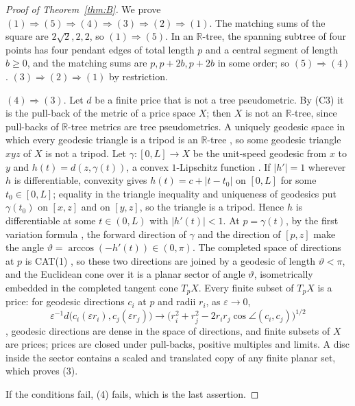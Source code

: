 \documentclass[11pt,a4paper]{article}
\theoremstyle{definition}
\newcommand{\R}{\mathbb{R}}
\newcommand{\CS}{\textup{C3}}
\begin{document}
\begin{proof}[Proof of Theorem~\ref{thm:B}]
We prove $(1)\Rightarrow(5)\Rightarrow(4)\Rightarrow(3)\Rightarrow(2)
\Rightarrow(1)$. The matching sums of the square are $2\sqrt2,2,2$, so
$(1)\Rightarrow(5)$. In an $\R$-tree, the spanning subtree of four points has
four pendant edges of total length $p$ and a central segment of length $b\ge0$,
and the matching sums are $p,p+2b,p+2b$ in some order; so $(5)\Rightarrow(4)$.
$(3)\Rightarrow(2)\Rightarrow(1)$ by restriction.

$(4)\Rightarrow(3)$. Let $d$ be a finite price that is not a tree pseudometric.
By (\CS) it is the pull-back of the metric of a price space $X$; then $X$ is not
an $\R$-tree, since pull-backs of $\R$-tree metrics are tree pseudometrics. A
uniquely geodesic space in which every geodesic triangle is a tripod is an
$\R$-tree \cite[Ex.~II.1.15(5)]{BH}, so some geodesic triangle $xyz$ of $X$ is not
a tripod. Let $\gamma\colon[0,L]\to X$ be the unit-speed geodesic from $x$ to $y$
and $h(t)=d(z,\gamma(t))$, a convex $1$-Lipschitz function
\cite[Prop.~II.2.2]{BH}. If $|h'|=1$ wherever $h$ is differentiable, convexity
gives $h(t)=c+|t-t_0|$ on $[0,L]$ for some $t_0\in[0,L]$; equality in the
triangle inequality and uniqueness of geodesics put $\gamma(t_0)$ on $[x,z]$ and
on $[y,z]$, so the triangle is a tripod. Hence $h$ is differentiable at some
$t\in(0,L)$ with $|h'(t)|<1$. At $p=\gamma(t)$, by the first variation formula
\cite[Cor.~II.3.6]{BH}, the forward direction of $\gamma$ and the direction of
$[p,z]$ make the angle $\vartheta=\arccos(-h'(t))\in(0,\pi)$. The completed space
of directions at $p$ is CAT(1) \cite[Thm.~II.3.19]{BH}, so these two directions are
joined by a geodesic of length $\vartheta<\pi$, and the Euclidean cone over it is
a planar sector of angle $\vartheta$, isometrically embedded in the completed
tangent cone $T_pX$. Every finite subset of $T_pX$ is a price: for geodesic
directions $c_i$ at $p$ and radii $r_i$, as $\varepsilon\to0$,
\[
\varepsilon^{-1}d\bigl(c_i(\varepsilon r_i),c_j(\varepsilon r_j)\bigr)
\to\bigl(r_i^2+r_j^2-2r_ir_j\cos\angle(c_i,c_j)\bigr)^{1/2}
\]
\cite[Prop.~II.3.1]{BH}, geodesic directions are dense in the space of
directions, and finite subsets of $X$ are prices; prices are closed under
pull-backs, positive multiples and limits. A disc inside the sector contains a
scaled and translated copy of any finite planar set, which proves (3).

If the conditions fail, (4) fails, which is the last assertion.
\end{proof}
\end{document}
